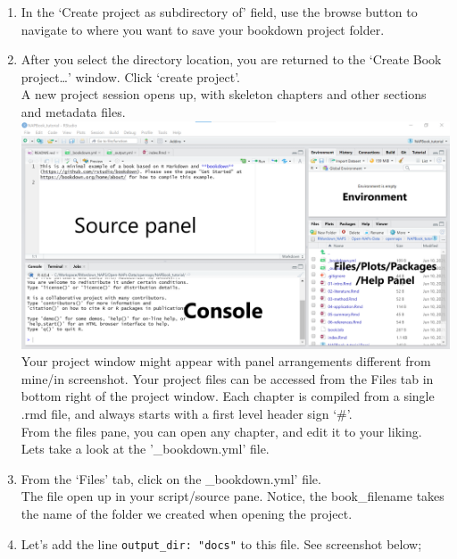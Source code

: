 \documentclass[
]{book}
\begin{document}
\begin{enumerate}
\item
  In the `Create project as subdirectory of' field, use the browse button to navigate to where you want to save your bookdown project folder.\\
\item
  After you select the directory location, you are returned to the `Create Book project\ldots{}' window. Click `create project'.\\
  A new project session opens up, with skeleton chapters and other sections and metadata files. \includegraphics{tutorial_screenshots/bkdn_proj_window_label.png}\\
  Your project window might appear with panel arrangements different from mine/in screenshot.
  Your project files can be accessed from the Files tab in bottom right of the project window.
  Each chapter is compiled from a single .rmd file, and always starts with a first level header sign `\#'.\\
  From the files pane, you can open any chapter, and edit it to your liking.\\
  Lets take a look at the '\_bookdown.yml' file.\\
\item
  From the `Files' tab, click on the \_bookdown.yml' file.\\
  The file open up in your script/source pane. Notice, the book\_filename takes the name of the folder we created when opening the project.\\
\item
  Let's add the line \texttt{output\_dir:\ "docs"} to this file.
  See screenshot below;\\

\end{enumerate}
\end{document}
